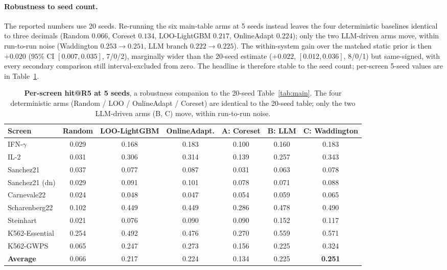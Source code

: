 \documentclass[11pt]{article}
\begin{document}
\paragraph{Robustness to seed count.} The reported numbers use 20 seeds. Re-running the six main-table
arms at 5 seeds instead leaves the four deterministic baselines identical to three decimals (Random
$0.066$, Coreset $0.134$, LOO-LightGBM $0.217$, OnlineAdapt $0.224$); only the two LLM-driven arms move,
within run-to-run noise (Waddington $0.253\!\rightarrow\!0.251$, LLM branch $0.222\!\rightarrow\!0.225$).
The within-system gain over the matched static prior is then $+0.020$ ($95\%$ CI $[0.007,0.035]$, 7/0/2),
marginally wider than the 20-seed estimate ($+0.022$, $[0.012,0.036]$, 8/0/1) but same-signed, with every
secondary comparison still interval-excluded from zero. The headline is therefore stable to the seed
count; per-screen 5-seed values are in Table~\ref{tab:seed5}.

\begin{table}[t]
\centering
\caption{\textbf{Per-screen hit@R5 at 5 seeds}, a robustness companion to the 20-seed
Table~\ref{tab:main}. The four deterministic arms (Random / LOO / OnlineAdapt / Coreset) are identical to
the 20-seed table; only the two LLM-driven arms (B, C) move, within run-to-run noise.}
\label{tab:seed5}
\small
\setlength{\tabcolsep}{4pt}
\begin{tabular}{lcccccc}
\toprule
Screen & Random & LOO-LightGBM & OnlineAdapt. & A: Coreset & B: LLM & C: Waddington \\
\midrule
IFN-$\gamma$   & 0.029 & 0.168 & 0.183 & 0.100 & 0.160 & 0.183 \\
IL-2           & 0.031 & 0.306 & 0.314 & 0.139 & 0.257 & 0.343 \\
Sanchez21      & 0.037 & 0.077 & 0.087 & 0.031 & 0.063 & 0.078 \\
Sanchez21 (dn) & 0.029 & 0.091 & 0.101 & 0.078 & 0.071 & 0.088 \\
Carnevale22    & 0.024 & 0.048 & 0.047 & 0.054 & 0.059 & 0.065 \\
Scharenberg22  & 0.102 & 0.449 & 0.449 & 0.286 & 0.478 & 0.490 \\
Steinhart      & 0.021 & 0.076 & 0.090 & 0.090 & 0.152 & 0.117 \\
K562-Essential & 0.254 & 0.492 & 0.476 & 0.270 & 0.559 & 0.571 \\
K562-GWPS      & 0.065 & 0.247 & 0.273 & 0.156 & 0.225 & 0.324 \\
\midrule
\textbf{Average} & 0.066 & 0.217 & 0.224 & 0.134 & 0.225 & \textbf{0.251} \\
\bottomrule
\end{tabular}
\end{table}
\end{document}
